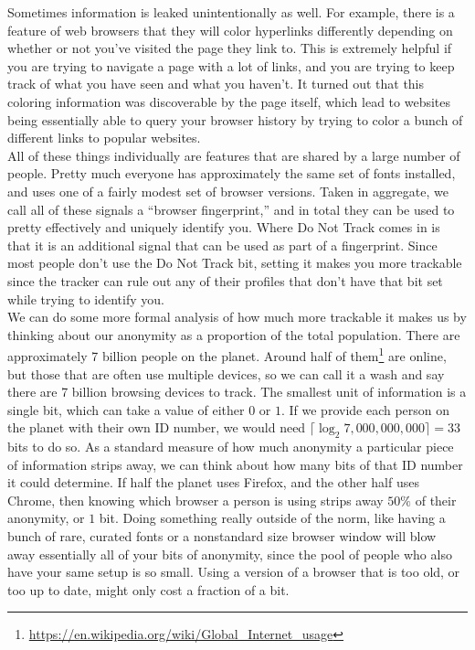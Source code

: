 \documentclass{article}
\begin{document}
Sometimes information is leaked unintentionally as well. For example, there is a feature of web browsers that they will color hyperlinks differently depending on whether or not you've visited the page they link to. This is extremely helpful if you are trying to navigate a page with a lot of links, and you are trying to keep track of what you have seen and what you haven't. It turned out that this coloring information was discoverable by the page itself, which lead to websites being essentially able to query your browser history by trying to color a bunch of different links to popular websites.\\

All of these things individually are features that are shared by a large number of people. Pretty much everyone has approximately the same set of fonts installed, and uses one of a fairly modest set of browser versions. Taken in aggregate, we call all of these signals a ``browser fingerprint,'' and in total they can be used to pretty effectively and uniquely identify you. Where Do Not Track comes in is that it is an additional signal that can be used as part of a fingerprint. Since most people don't use the Do Not Track bit, setting it makes you more trackable since the tracker can rule out any of their profiles that don't have that bit set while trying to identify you.\\

We can do some more formal analysis of how much more trackable it makes us by thinking about our anonymity as a proportion of the total population. There are approximately 7 billion people on the planet. Around half of them\footnote{\url{https://en.wikipedia.org/wiki/Global_Internet_usage}} are online, but those that are often use multiple devices, so we can call it a wash and say there are 7 billion browsing devices to track. The smallest unit of information is a single bit, which can take a value of either $0$ or $1$. If we provide each person on the planet with their own ID number, we would need $\lceil\log_2{7,000,000,000}\rceil = 33$ bits to do so. As a standard measure of how much anonymity a particular piece of information strips away, we can think about how many bits of that ID number it could determine. If half the planet uses Firefox, and the other half uses Chrome, then knowing which browser a person is using strips away $50\%$ of their anonymity, or $1$ bit. Doing something really outside of the norm, like having a bunch of rare, curated fonts or a nonstandard size browser window will blow away essentially all of your bits of anonymity, since the pool of people who also have your same setup is so small. Using a version of a browser that is too old, or too up to date, might only cost a fraction of a bit.\\
\end{document}
